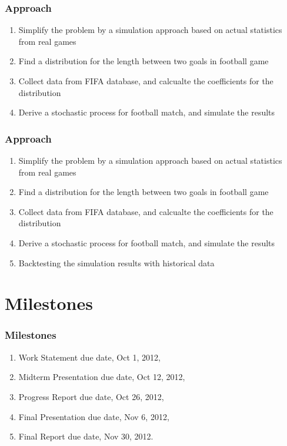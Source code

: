 \documentclass[compress,handout,10pt]{beamer}
\let\olditem\item
\renewcommand{\item}{\setlength{\itemsep}{0.5\baselineskip}\olditem}
\begin{document}
\begin{frame}
    \frametitle{Approach}
       \begin{enumerate}
         \item  Simplify the problem by a simulation approach based on actual statistics from real games
         \item  Find a distribution for the length between two goals in football game
         \item  Collect data from FIFA database, and calcualte the coefficients for the distribution
         \item  Derive a stochastic process for football match, and simulate the results
     \end{enumerate}
\end{frame}

\begin{frame}
    \frametitle{Approach}
       \begin{enumerate}
         \item  Simplify the problem by a simulation approach based on actual statistics from real games
         \item  Find a distribution for the length between two goals in football game
         \item  Collect data from FIFA database, and calcualte the coefficients for the distribution
         \item  Derive a stochastic process for football match, and simulate the results
          \item  Backtesting the simulation results with historical data
     \end{enumerate}
\end{frame}

\section{Milestones}

\begin{frame}
    \frametitle{Milestones}
      \begin{enumerate}
        \item Work Statement due date, Oct 1, 2012,
        \item Midterm Presentation due date, Oct 12, 2012,
        \item Progress Report due date, Oct 26, 2012,
        \item Final Presentation due date, Nov 6, 2012,
        \item Final Report due date, Nov 30, 2012.
     \end{enumerate}
\end{frame}
\end{document}
